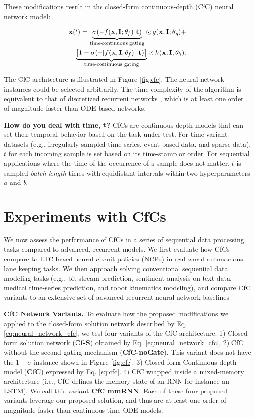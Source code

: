 \documentclass[12pt]{article}
\begin{document}
\noindent These modifications result in the closed-form continuous-depth (CfC) neural network model:

\begin{align}
\label{eq:cfc}
\textbf{x}(t) = \textcolor{black}{\underbrace{\sigma(-f(\textbf{x}, \textbf{I};\theta_f) ~\textcolor{black}{\textbf{t}})}_\text{time-continuous gating}} \odot g(\textbf{x},\textbf{I};\theta_g) + \\ \nonumber \textcolor{black}{\underbrace{\big[ 1 -\sigma(-[f(\textbf{x}, \textbf{I};\theta_f)] ~\textcolor{black}{\textbf{t}}) \big]}_\text{time-continuous gating}} \odot h(\textbf{x},\textbf{I};\theta_h).
\end{align}

The CfC architecture is illustrated in Figure \ref{fig:cfc}. The neural network instances could be selected arbitrarily. The time complexity of the algorithm is equivalent to that of discretized recurrent networks \cite{hasani2019response}, which is at least one order of magnitude faster than ODE-based networks. 

\noindent \textbf{How do you deal with time, $\textcolor{black}{\textbf{t}}$?} CfCs are continuous-depth models that can set their temporal behavior based on the task-under-test. For time-variant datasets (e.g., irregularly sampled time series, event-based data, and sparse data), $t$ for each incoming sample is set based on its time-stamp or order. For sequential applications where the time of the occurrence of a sample does not matter, $t$ is sampled \textit{batch-length}-times with equidistant intervals within two hyperparameters $a$ and $b$.


\section*{Experiments with CfCs}
We now assess the performance of CfCs in a series of sequential data processing tasks compared to advanced, recurrent models. We first evaluate how CfCs compare to LTC-based neural circuit policies (NCPs) \cite{lechner2020neural} in real-world autonomous lane keeping tasks. We then approach solving conventional sequential data modeling tasks (e.g., bit-stream prediction, sentiment analysis on text data, medical time-series prediction, and robot kinematics modeling), and compare CfC variants to an extensive set of advanced recurrent neural network baselines.

\noindent \textbf{CfC Network Variants.} To evaluate how the proposed modifications we applied to the closed-form solution network described by Eq. \ref{eq:neural_network_cfc}, we test four variants of the CfC architecture: 1) Closed-form solution network (\textbf{Cf-S}) obtained by Eq. \ref{eq:neural_network_cfc}, 2) CfC without the second gating mechanism (\textbf{CfC-noGate}). This variant does not have the $1-\sigma$ instance shown in Figure \ref{fig:cfc}. 3) Closed-form Continuous-depth model (\textbf{CfC}) expressed by Eq. \ref{eq:cfc}. 4) CfC wrapped inside a mixed-memory architecture (i.e., CfC defines the memory state of an RNN for instance an LSTM). We call this variant \textbf{CfC-mmRNN}. Each of these four proposed variants leverage our proposed solution, and thus are at least one order of magnitude faster than continuous-time ODE models. 
\end{document}
